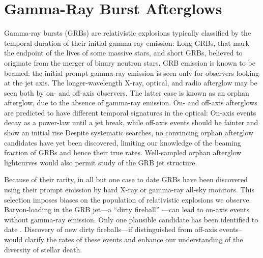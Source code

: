 %
%
%
%
%
%
%

\section{Gamma-Ray Burst Afterglows}
\def\secname{grbs}\label{sec:\secname} %


Gamma-ray bursts (GRBs) are relativistic explosions typically classified by the temporal duration of their initial gamma-ray emission: Long GRBs, that mark the endpoint of the lives of some massive stars, and short GRBs, believed to originate from the merger of binary neutron stars.
GRB emission is known to be beamed: the initial prompt gamma-ray emission is seen only for observers looking at the jet axis. The longer-wavelength X-ray, optical, and radio afterglow may be seen both by on- and off-axis observers.  The latter case is known as an orphan afterglow, due to the absence of gamma-ray emission.  
On- and off-axis afterglows are predicted to have different temporal signatures in the optical: On-axis events decay as a power-law until a jet break, while off-axis events should be fainter and show an initial rise 
Despite systematic searches, no convincing orphan afterglow candidates have yet been discovered, limiting our knowledge of the beaming fraction of GRBs and hence their true rates.
Well-sampled orphan afterglow lightcurves would also permit study of the GRB 
jet structure.

Because of their rarity, in all but one case \citep{2015ApJ...803L..24C} to date GRBs have been discovered using their prompt emission by hard X-ray or gamma-ray all-sky monitors.  
This selection imposes biases on the population of relativistic explosions we observe.  
Baryon-loading in the GRB jet---a ``dirty fireball'' \citep{2003ApJ...591.1097R}---can lead to on-axis events without gamma-ray emission.  Only one plausible candidate has been identified to date \citep{2013ApJ...769..130C}.  
Discovery of new dirty fireballs---if distinguished from off-axis events--would clarify the rates of these events and enhance our understanding of the diversity of stellar death.

